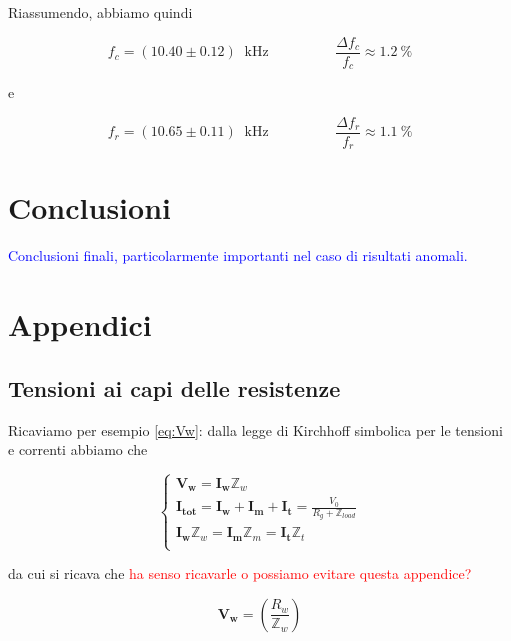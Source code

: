 \documentclass[12pt,italian]{article}
\newcommand{\prof}[1]{\textcolor{blue}{#1}}
\newcommand{\err}[1]{\textcolor{red}{#1}}
\begin{document}
Riassumendo, abbiamo quindi

\begin{equation*}
	f_{c} = (10.40 \pm 0.12)\  \text{ kHz} \hspace{2cm} \frac{\Delta f_{c}}{f_{c}} \approx 1.2 \ \%
\end{equation*}

\noindent
e

\begin{equation*}
	f_{r} = (10.65 \pm 0.11)\  \text{ kHz} \hspace{2cm} \frac{\Delta f_{r}}{f_{r}} \approx 1.1 \ \%
\end{equation*}

\section*{Conclusioni}
\prof{Conclusioni finali, particolarmente importanti nel caso di risultati
	anomali.}

\appendix
\section{Appendici}
\subsection{Tensioni ai capi delle resistenze}
\label{sec:tensioni}

Ricaviamo per esempio \eqref{eq:Vw}: dalla legge di Kirchhoff simbolica per le
tensioni e correnti abbiamo che

\begin{equation}
	\begin{cases}
		\mathbf{V_{w}} = \mathbf{I_{w}} \mathbb{Z}_{w}                                                                \\
		\mathbf{I_{tot}} = \mathbf{I_{w}} + \mathbf{I_{m}} + \mathbf{I_{t}} = \frac{V_{0}}{R_{g} + \mathbb{Z}_{load}} \\
		\mathbf{I_{w}} \mathbb{Z}_{w} = \mathbf{I_{m}} \mathbb{Z}_{m} = \mathbf{I_{t}} \mathbb{Z}_{t}                 \\
	\end{cases}
\end{equation}

\noindent
da cui si ricava che \err{ha senso ricavarle o possiamo evitare questa appendice?}

\begin{equation}
	\mathbf{V_{w}} = \left( \frac{R_{w}}{\mathbb{Z}_{w}} \right)
\end{equation}
\end{document}
